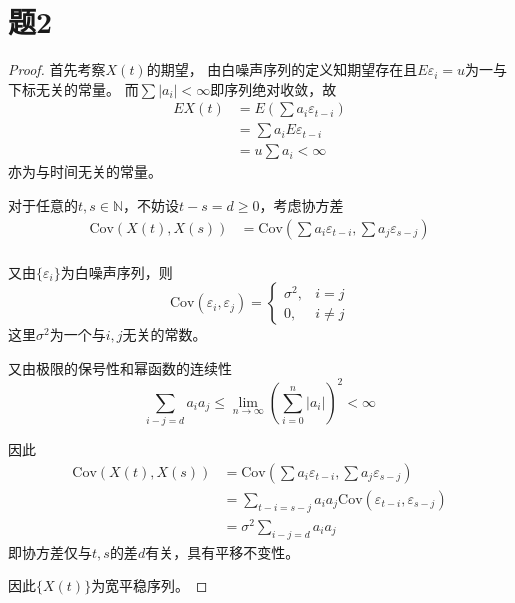 \documentclass[cn]{homework}
\begin{document}
    \section{题2}
    \begin{proof}
        首先考察$X(t)$的期望，
        由白噪声序列的定义知期望存在且$E\varepsilon_i=u$为一与下标无关的常量。
        而$\sum |a_i|<\infty$即序列绝对收敛，故
        \begin{align*}
            EX(t)&=E(\sum a_i\varepsilon_{t-i})\\
                 &=\sum a_iE\varepsilon_{t-i}\\
                 &=u\sum a_i < \infty
        \end{align*}
        亦为与时间无关的常量。


        对于任意的$t,s\in\mathbb N$，不妨设$t-s=d\geq 0$，考虑协方差
        \begin{align*}
            \mathrm{Cov}(X(t),X(s))&=\mathrm{Cov}(\sum a_i\varepsilon_{t-i},\sum a_j\varepsilon_{s-j})\\
        \end{align*}

        又由$\{\varepsilon_i\}$为白噪声序列，则
        \[\mathrm{Cov}(\varepsilon_i,\varepsilon_j)=\begin{cases}
            \sigma^2,&i=j\\
            0,       &i\neq j
        \end{cases}\]
        这里$\sigma^2$为一个与$i,j$无关的常数。

        又由极限的保号性和幂函数的连续性
        \[\sum_{i-j=d}a_ia_j\leq\lim_{n\to\infty}\left(\sum_{i=0}^n|a_i|\right)^2
        <\infty\]

        因此
        \begin{align*}
            \mathrm{Cov}(X(t),X(s))&=\mathrm{Cov}(\sum a_i\varepsilon_{t-i},\sum a_j\varepsilon_{s-j})\\
                                   &=\sum_{t-i=s-j}a_ia_j\mathrm{Cov}(\varepsilon_{t-i},\varepsilon_{s-j})\\
                                   &=\sigma^2\sum_{i-j=d}a_ia_j
        \end{align*}
        即协方差仅与$t,s$的差$d$有关，具有平移不变性。

        因此$\{X(t)\}$为宽平稳序列。
    \end{proof}
\end{document}
